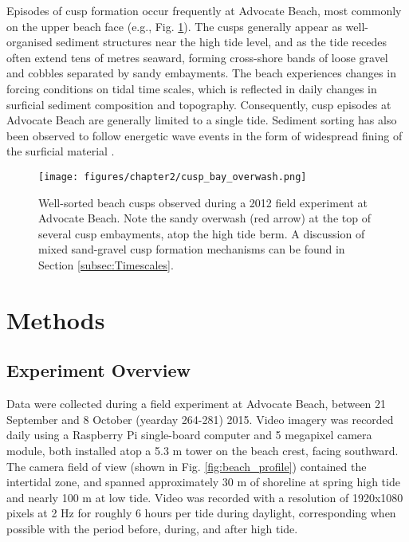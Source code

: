Episodes of cusp formation occur frequently at Advocate Beach, most commonly on the upper beach face (e.g., Fig. \ref{fig:cusp_bay_overwash}). The cusps generally appear as well-organised sediment structures near the high tide level, and as the tide recedes often extend tens of metres seaward, forming cross-shore bands of loose gravel and cobbles separated by sandy embayments. The beach experiences changes in forcing conditions on tidal time scales, which is reflected in daily changes in surficial sediment composition and topography. Consequently, cusp episodes at Advocate Beach are generally limited to a single tide. Sediment sorting has also been observed to follow energetic wave events in the form of widespread fining of the surficial material \citep{Hay_etal2014}.

\begin{figure}[tbp]%
 	\texttt{[image: figures/chapter2/cusp\_bay\_overwash.png]}
	\caption[Photograph of well-sorted beach cusps]{Well-sorted beach cusps observed during a 2012 field experiment at Advocate Beach. Note the sandy overwash (red arrow) at the top of several cusp embayments, atop the high tide berm. A discussion of mixed sand-gravel cusp formation mechanisms can be found in Section \ref{subsec:Timescales}.}
	\label{fig:cusp_bay_overwash}
\end{figure}



\section{Methods}\label{ch2:Methods} 

\subsection{Experiment Overview}\label{subsec:Overview}

Data were collected during a field experiment at Advocate Beach, between 21 September and 8 October (yearday 264-281) 2015. Video imagery was recorded daily using a Raspberry Pi single-board computer and 5 megapixel camera module, both installed atop a 5.3 m tower on the beach crest, facing southward. The camera field of view (shown in Fig. \ref{fig:beach_profile}) contained the intertidal zone, and spanned approximately 30 m of shoreline at spring high tide and nearly 100 m at low tide. Video was recorded with a resolution of 1920x1080 pixels at 2 Hz for roughly 6 hours per tide during daylight, corresponding when possible with the period before, during, and after high tide.  

